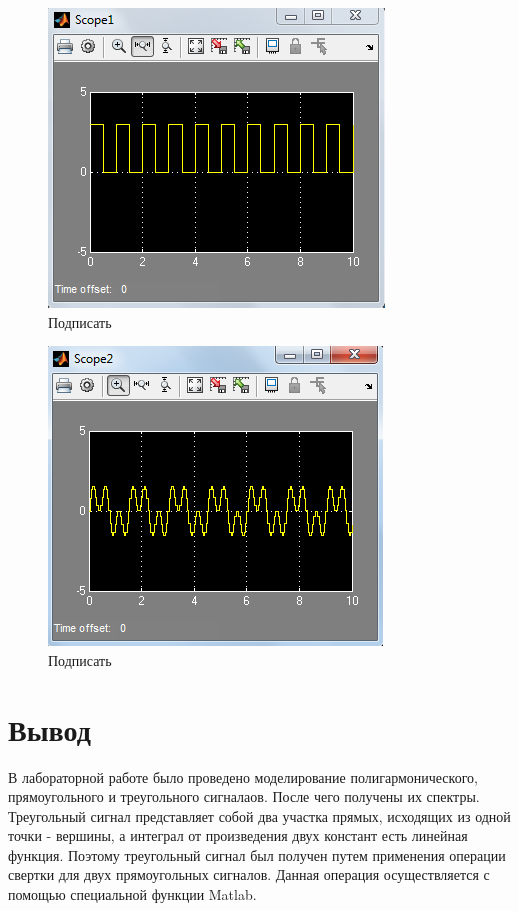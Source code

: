 \documentclass[a4paper, 12pt]{article}
\begin{document}
\begin{figure}[H]
   \includegraphics[scale=0.7]{lab5/scope1.png}
   \caption{Подписать}
\end{figure}
\begin{figure}[H]
   \includegraphics[scale=0.7]{lab5/scope2.png}
   \caption{Подписать}
\end{figure}


\section{Вывод}
В лабораторной работе было проведено моделирование полигармонического, прямоугольного и треугольного сигналаов. После чего получены их спектры. Треугольный сигнал представляет собой два участка прямых,
исходящих из одной точки - вершины, а интеграл от произведения двух констант есть линейная функция.
Поэтому треугольный сигнал был получен путем применения операции свертки для двух прямоугольных сигналов.  Данная операция осуществляется с помощью специальной функции Matlab. 
	
\end{document}

